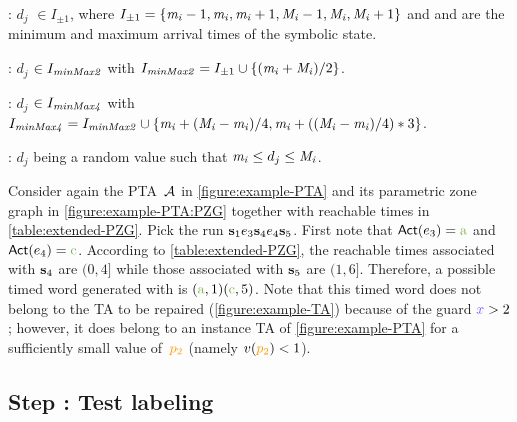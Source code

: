 \begin{tikzborder}{\cite{Gargantini16:validation}}
\begin{tikzborder}{\cite{gargantini_combinatorial_2017}}
\begin{tikzborder}{\cite{gargantini_combinatorial_2017}}
\begin{tikzborder}{\cite{garn2019}}
\begin{tikzborder}{\cite{arcaini2019achieving}}
\begin{tikzborder}{\cite{arcaini2019varivolution}}
\begin{tikzborder}{}
\begin{compactitem}
	\item \policyminusplus: $d_j$ $\in I_{\pm 1}$, where $I_{\pm 1}=\{\mathit{m_i}-1, \mathit{m_i}, \mathit{m_i}+1, \mathit{M_i}-1, \mathit{M_i}, \mathit{M_i}+1\}$ and \mintime and \maxtime are the minimum and maximum arrival times of the symbolic state.
	\item \policymiddle: $d_j$ $\in I_{\it minMax2}$ with $I_{\it minMax2} = I_{\pm 1} \cup \{(\mathit{m_i}+\mathit{M_i})/2 \}$.
	\item \policyquarter: $d_j$ $\in I_{\it minMax4}$ with $I_{\it minMax4} = I_{\it minMax2} \cup \{\mathit{m_i}+ (\mathit{M_i}-\mathit{m_i})/4, \mathit{m_i}+ ((\mathit{M_i}-\mathit{m_i})/4)*3\}$.
	\item \policyrand: $d_j$ being a random value such that $\mathit{m_i} \le d_j \le \mathit{M_i}$.
\end{compactitem}

\begin{example}\label{example:timedword}
	Consider again the PTA~$\mathcal{A}$ in \ref{figure:example-PTA} and its parametric zone graph in \ref{figure:example-PTA:PZG} together with reachable times in \ref{table:extended-PZG}.
	Pick the run $\mathbf{s}_1 e_3 \mathbf{s}_4 e_4 \mathbf{s}_5$.
	First note that $\act(\edge_3) = \styleact{a}$ and $\act(\edge_4) = \styleact{c}$.
	According to \ref{table:extended-PZG}, the reachable times associated with $\mathbf{s}_4$ are $(0,4]$ while those associated with $\mathbf{s}_5$ are $(1,6]$.
	Therefore, a possible timed word generated with \policyminusplus is $(\styleact{a}, 1) (\styleact{c}, 5)$.
	Note that this timed word does not belong to the TA to be repaired (\ref{figure:example-TA}) because of the guard $\styleclock{x} > 2$; however, it does belong to an instance TA of \ref{figure:example-PTA} for a sufficiently small value of~$\parami{2}$ (namely $\pval(\parami{2}) < 1$).
\end{example}
\end{tikzborder}

\subsection{Step : Test labeling}


\end{tikzborder}
\end{tikzborder}
\end{tikzborder}
\end{tikzborder}
\end{tikzborder}
\end{tikzborder}
